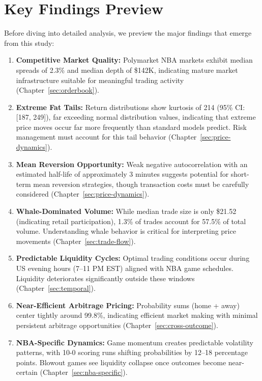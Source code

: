 \section{Key Findings Preview}

Before diving into detailed analysis, we preview the major findings that emerge from this study:

\begin{enumerate}
    \item \textbf{Competitive Market Quality:} Polymarket NBA markets exhibit median spreads of 2.3\% and median depth of \$142K, indicating mature market infrastructure suitable for meaningful trading activity (Chapter~\ref{sec:orderbook}).

    \item \textbf{Extreme Fat Tails:} Return distributions show kurtosis of 214 (95\% CI: [187, 249]), far exceeding normal distribution values, indicating that extreme price moves occur far more frequently than standard models predict. Risk management must account for this tail behavior (Chapter~\ref{sec:price-dynamics}).

    \item \textbf{Mean Reversion Opportunity:} Weak negative autocorrelation with an estimated half-life of approximately 3 minutes suggests potential for short-term mean reversion strategies, though transaction costs must be carefully considered (Chapter~\ref{sec:price-dynamics}).

    \item \textbf{Whale-Dominated Volume:} While median trade size is only \$21.52 (indicating retail participation), 1.3\% of trades account for 57.5\% of total volume. Understanding whale behavior is critical for interpreting price movements (Chapter~\ref{sec:trade-flow}).

    \item \textbf{Predictable Liquidity Cycles:} Optimal trading conditions occur during US evening hours (7--11 PM EST) aligned with NBA game schedules. Liquidity deteriorates significantly outside these windows (Chapter~\ref{sec:temporal}).

    \item \textbf{Near-Efficient Arbitrage Pricing:} Probability sums (home + away) center tightly around 99.8\%, indicating efficient market making with minimal persistent arbitrage opportunities (Chapter~\ref{sec:cross-outcome}).

    \item \textbf{NBA-Specific Dynamics:} Game momentum creates predictable volatility patterns, with 10-0 scoring runs shifting probabilities by 12--18 percentage points. Blowout games see liquidity collapse once outcomes become near-certain (Chapter~\ref{sec:nba-specific}).
\end{enumerate}

